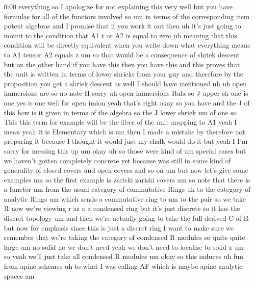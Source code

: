 \begin{unfinished}{0:00}
everything  so  I  apologize  for  not
explaining  this  very  well  but  you  have
formulas  for  all  of  the  functors
involved  so  um  in  terms  of  the
corresponding  item  potent  algebras  and  I
promise  that  if  you  work  it  out  then  uh
it's  just  going  to  mount  to  the
condition  that  A1  t  or  A2  is  equal  to
zero  uh  meaning  that  this  condition  will
be  directly  equivalent  when  you  write
down  what  everything  means  to  A1  tensor
A2  equals
z  um  so  that  would  be  a  consequence  of
shriek  descent  but  on  the  other  hand  if
you  have  this  then  you  have  this  and
this  proves  that  the  unit  is  written  in
terms  of  lower  shrieks  from  your  guy  and
therefore  by  the  proposition  you  get  a
shriek  descent  as
well
I  should  have  mentioned  uh  uh  open
immersions  are  so  no  note  H  sorry  uh
open
immersions
Rula  so  J  upper  sh  one  is  one  yes  is
one
well  for  open  imion  yeah  that's  right
okay  so  you  have  and  the  J  of  this  how
is  it  given  in  terms  of  the
algebra  so  the  J  lower  shriek  um  of  one
so  This  this  term  for  example  will  be
the  fiber  of  the  unit  mapping  to
A1
yeah  I  mean  yeah  it  is  Elementary  which
is  um  then  I  made  a  mistake  by  therefore
not  preparing  it  because  I  thought  it
would  just  my  chalk  would  do  it  but  yeah
I  I'm  sorry  for  messing  this
up
um
okay
uh  so  those  were  kind  of  um  special
cases  but  we  haven't  gotten  completely
concrete  yet  because  was  still  in  some
kind  of  generality  of  closed  covers  and
open  covers  and  so  on  um
but  now  let's  give  some
examples
um  so  the  first  example  is  zariski
zariski
covers
um  so  note  that  there  is  a  functor  um
from  the  usual  category  of  commutative
Rings  uh  to  the  category  of  analytic
Rings  um  which  sends  a  commutative  ring
to
um  to  the  pair  so  we  take  R  now  we're
viewing  r  as
a  a  condensed  ring  but  it's  just
discrete  so  it  has  the  discret
topology  um  and  then  we're  actually
going  to  take  the  full  derived  C  of  R
but  now  for  emphasis  since  this  is  just
a  discret  ring  I  want  to  make  sure  we
remember  that  we're  taking  the  category
of  condensed  R  modules  so  quite  quite
large
um  no  solid  no  we  don't  need  yeah  we
don't  need  to  localize  to  solid  z  um  so
yeah  we'll  just  take  all  condensed  R
modules  um  okay  so  this
induces  uh  fun  from  apine
schemes  uh  to  what  I  was  calling  AF
which  is  maybe  apine  analytic  spaces  um

\end{unfinished}
